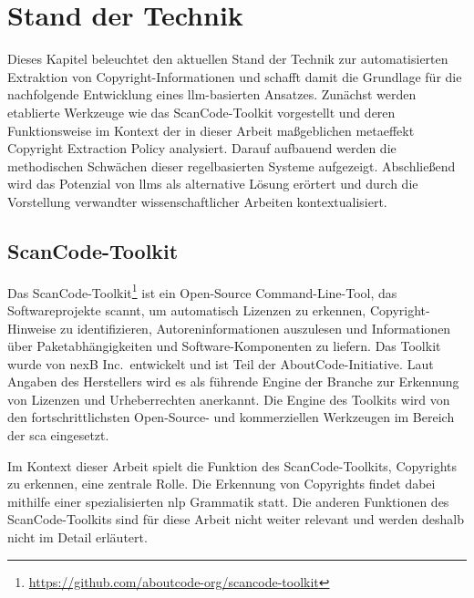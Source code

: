 \chapter{Stand der Technik}\label{ch:stand-der-technik}

Dieses Kapitel beleuchtet den aktuellen Stand der Technik zur automatisierten Extraktion von Copyright-Informationen und schafft damit die Grundlage für die nachfolgende Entwicklung eines \gls{llm}-basierten Ansatzes.
Zunächst werden etablierte Werkzeuge wie das ScanCode-Toolkit vorgestellt und deren Funktionsweise im Kontext der in dieser Arbeit maßgeblichen metaeffekt Copyright Extraction Policy analysiert.
Darauf aufbauend werden die methodischen Schwächen dieser regelbasierten Systeme aufgezeigt.
Abschließend wird das Potenzial von \glspl{llm} als alternative Lösung erörtert und durch die Vorstellung verwandter wissenschaftlicher Arbeiten kontextualisiert.


\section{ScanCode-Toolkit}\label{sec:scancode-toolkit}

Das ScanCode-Toolkit\footnote{\url{https://github.com/aboutcode-org/scancode-toolkit}} ist ein Open-Source Command-Line-Tool, das Softwareprojekte scannt, um automatisch Lizenzen zu erkennen, Copyright-Hinweise zu identifizieren, Autoreninformationen auszulesen und Informationen über Paketabhängigkeiten und Software-Komponenten zu liefern.
Das Toolkit wurde von nexB Inc.\ entwickelt und ist Teil der AboutCode-Initiative.
Laut Angaben des Herstellers wird es als führende Engine der Branche zur Erkennung von Lizenzen und Urheberrechten anerkannt.
Die Engine des Toolkits wird von den fortschrittlichsten Open-Source- und kommerziellen Werkzeugen im Bereich der \gls{sca} eingesetzt.

Im Kontext dieser Arbeit spielt die Funktion des ScanCode-Toolkits, Copyrights zu erkennen, eine zentrale Rolle.
Die Erkennung von Copyrights findet dabei mithilfe einer spezialisierten \gls{nlp} Grammatik statt.
Die anderen Funktionen des ScanCode-Toolkits sind für diese Arbeit nicht weiter relevant und werden deshalb nicht im Detail erläutert\autocite{noauthor_scancode-toolkit-documentation_nodate}.


